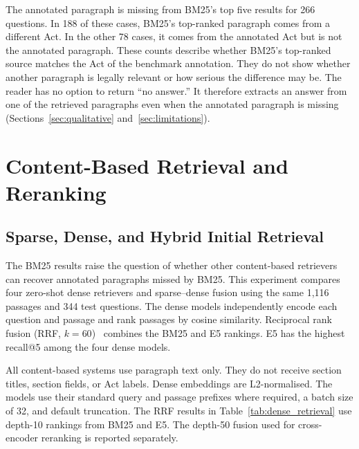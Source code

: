 \documentclass[pdflatex,sn-basic]{sn-jnl}%
\theoremstyle{thmstyleone}%
\theoremstyle{thmstyletwo}%
\theoremstyle{thmstylethree}%
\begin{document}
The annotated paragraph is missing from BM25's top five results for 266
questions. In 188 of these cases, BM25's top-ranked paragraph comes from a
different Act. In the other 78 cases, it comes from the annotated Act but is
not the annotated paragraph. These counts describe whether BM25's top-ranked
source matches the Act of the benchmark annotation. They do not show whether
another paragraph is legally relevant or how serious the difference may be.
The reader has no option to return ``no answer.'' It therefore extracts an
answer from one of the retrieved paragraphs even when the annotated paragraph
is missing (Sections~\ref{sec:qualitative} and~\ref{sec:limitations}).

\section{Content-Based Retrieval and Reranking}
\label{sec:content_retrieval}

\subsection{Sparse, Dense, and Hybrid Initial Retrieval}
\label{sec:dense_retrieval}

The BM25 results raise the question of whether other content-based retrievers
can recover annotated paragraphs missed by BM25. This experiment compares four
zero-shot dense retrievers and sparse--dense fusion using the same 1,116
passages and 344 test questions. The dense models independently encode each
question and passage and rank passages by cosine similarity. Reciprocal rank
fusion (RRF, $k{=}60$)~\citep{cormack2009rrf} combines the BM25 and E5
rankings. E5 has the highest recall@5 among the four dense models.

All content-based systems use paragraph text only. They do not receive section
titles, section fields, or Act labels. Dense embeddings are L2-normalised. The
models use their standard query and passage prefixes where required, a batch
size of 32, and default truncation. The RRF results in
Table~\ref{tab:dense_retrieval} use depth-10 rankings from BM25 and E5. The
depth-50 fusion used for cross-encoder reranking is reported separately.
\end{document}
